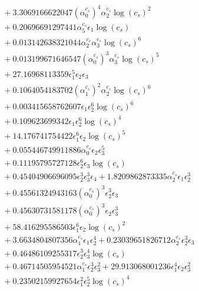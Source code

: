 \documentclass[10pt]{article}
\begin{document}
\begin{align*}
&{}  + 3.3069166622047 \left(\alpha_{0}^{c_s}\right)^{4} \alpha_{2}^{c_s} \log{\left(c_{s} \right)}^{2} \\
&{}  + 0.20696691297441 \alpha_{5}^{c_s} \epsilon_{1} \log{\left(c_{s} \right)} \\
&{}  + 0.013142638321044 \alpha_{2}^{c_s} \alpha_{3}^{c_s} \log{\left(c_{s} \right)}^{6} \\
&{}  + 0.013199671646547 \left(\alpha_{0}^{c_s}\right)^{3} \alpha_{3}^{c_s} \log{\left(c_{s} \right)}^{5} \\
&{}  + 27.16968113359 \epsilon_{1}^{5} \epsilon_{2} \epsilon_{3} \\
&{}  + 0.1064054183702 \left(\alpha_{1}^{c_s}\right)^{2} \alpha_{2}^{c_s} \log{\left(c_{s} \right)}^{6} \\
&{}  + 0.003415658762607 \epsilon_{1} \epsilon_{2}^{6} \log{\left(c_{s} \right)}^{6} \\
&{}  + 0.109623699342 \epsilon_{1} \epsilon_{2}^{6} \log{\left(c_{s} \right)}^{4} \\
&{}  + 14.176741754422 \epsilon_{1}^{6} \epsilon_{2} \log{\left(c_{s} \right)}^{5} \\
&{}  + 0.055446749911886 \alpha_{0}^{c_s} \epsilon_{2} \epsilon_{3}^{5} \\
&{}  + 0.11195795727128 \epsilon_{2}^{6} \epsilon_{3} \log{\left(c_{s} \right)} \\
&{}  + 0.45404906696095 \epsilon_{2}^{3} \epsilon_{3}^{3} \epsilon_{4} + 1.8209862873335 \alpha_{2}^{c_s} \epsilon_{1} \epsilon_{2}^{3} \\
&{}  + 0.45561324943163 \left(\alpha_{0}^{c_s}\right)^{3} \epsilon_{2}^{3} \epsilon_{3} \\
&{}  + 0.45630731581178 \left(\alpha_{0}^{c_s}\right)^{3} \epsilon_{2} \epsilon_{3}^{3} \\
&{}  + 58.416295586503 \epsilon_{1}^{6} \epsilon_{2} \log{\left(c_{s} \right)}^{2} \\
&{}  + 3.6634804807356 \alpha_{1}^{c_s} \epsilon_{1} \epsilon_{2}^{4} + 0.23039651826712 \alpha_{2}^{c_s} \epsilon_{2}^{3} \epsilon_{3} \\
&{}  + 0.46486109255317 \epsilon_{2}^{3} \epsilon_{3}^{4} \log{\left(c_{s} \right)} \\
&{}  + 0.46714505954521 \alpha_{1}^{c_s} \epsilon_{2}^{3} \epsilon_{3}^{2} + 29.913068001236 \epsilon_{1}^{4} \epsilon_{2} \epsilon_{3}^{2} \\
&{}  + 0.23502159927654 \epsilon_{1}^{2} \epsilon_{2}^{5} \log{\left(c_{s} \right)}^{4} \\

\end{align*}
\end{document}
